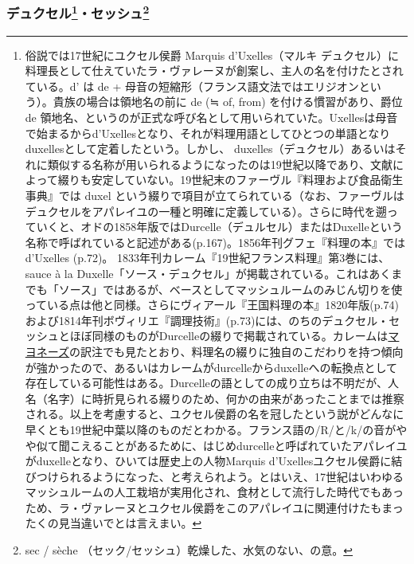 \begin{recette}
\atoaki{}

\hypertarget{duxelles-seche}{%
\subsubsection[デュクセル・セッシュ]{\texorpdfstring{デュクセル\footnote{俗説では17世紀にユクセル侯爵
  Marquis d'Uxelles（マルキ
  デュクセル）に料理長として仕えていたラ・ヴァレーヌが創案し、主人の名を付けたとされている。d'
  は de +
  母音の短縮形（フランス語文法ではエリジオンという）。貴族の場合は領地名の前に
  de (≒ of, from) を付ける慣習があり、爵位 de
  領地名、というのが正式な呼び名として用いられていた。Uxellesは母音で始まるからd'Uxellesとなり、それが料理用語としてひとつの単語となりduxellesとして定着したという。しかし、
  duxelles（デュクセル）あるいはそれに類似する名称が用いられるようになったのは19世紀以降であり、文献によって綴りも安定していない。19世紀末のファーヴル『料理および食品衛生事典』では
  duxel
  という綴りで項目が立てられている（なお、ファーヴルはデュクセルをアパレイユの一種と明確に定義している）。さらに時代を遡っていくと、オドの1858年版ではDurcelle（デュルセル）またはDuxelleという名称で呼ばれていると記述がある(p.167)。1856年刊グフェ『料理の本』ではd'Uxelles
  (p.72)。 1833年刊カレーム『19世紀フランス料理』第3巻には、sauce à la
  Duxelle「ソース・デュクセル」が掲載されている。これはあくまでも「ソース」ではあるが、ベースとしてマッシュルームのみじん切りを使っている点は他と同様。さらにヴィアール『王国料理の本』1820年版(p.74)
  および1814年刊ボヴィリエ『調理技術』(p.73)には、のちのデュクセル・セッシュとほぼ同様のものがDurcelleの綴りで掲載されている。カレームは\protect\hyperlink{mayonnaise}{マヨネーズ}の訳注でも見たとおり、料理名の綴りに独自のこだわりを持つ傾向が強かったので、あるいはカレームがdurcelleからduxelleへの転換点として存在している可能性はある。Durcelleの語としての成り立ちは不明だが、人名（名字）に時折見られる綴りのため、何かの由来があったことまでは推察される。以上を考慮すると、ユクセル侯爵の名を冠したという説がどんなに早くとも19世紀中葉以降のものだとわかる。フランス語の/R/と/k/の音がやや似て聞こえることがあるために、はじめdurcelleと呼ばれていたアパレイユがduxelleとなり、ひいては歴史上の人物Marquis
  d'Uxellesユクセル侯爵に結びつけられるようになった、と考えられよう。とはいえ、17世紀はいわゆるマッシュルームの人工栽培が実用化され、食材として流行した時代でもあっため、ラ・ヴァレーヌとユクセル侯爵をこのアパレイユに関連付けたもまったくの見当違いでとは言えまい。}・セッシュ\footnote{sec
  / sèche （セック/セッシュ）乾燥した、水気のない、の意。}}{デュクセル・セッシュ}}\label{duxelles-seche}}


\end{recette}
